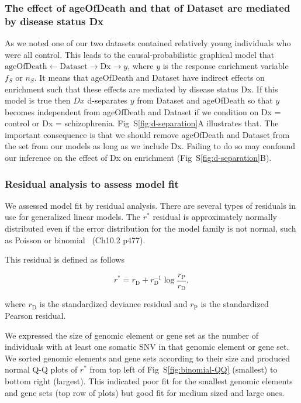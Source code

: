 \documentclass[letterpaper]{article}
\begin{document}
\subsubsection*{The effect of ageOfDeath and that of Dataset are mediated by disease status Dx}

As we noted one of our two datasets contained relatively young individuals who
were all control.  This leads to the causal-probabilistic graphical model that
\(\mathrm{ageOfDeath} \leftarrow \mathrm{Dataset} \rightarrow \mathrm{Dx}
\rightarrow y\), where \(y\) is the response enrichment variable \(f_S\) or
\(n_S\).  It means that ageOfDeath and Dataset have indirect effects on
enrichment such that these effects are mediated by disease status Dx. If this
model is true then \(Dx\) d-separates \(y\) from Dataset and ageOfDeath so
that \(y\) becomes independent from ageOfDeath and Dataset if we condition on
Dx = control or Dx = schizophrenia.  Fig~S\ref{fig:d-separation}A illustrates
that.  The important consequence is that we should remove ageOfDeath and
Dataset from the set from our models as long as we include Dx.  Failing to do
so may confound our inference on the effect of Dx on enrichment
(Fig~S\ref{fig:d-separation}B).

\subsubsection*{Residual analysis to assess model fit }

We assessed model fit by residual analysis.  There are several types of residuals in use for generalized linear models.
The $r^\ast$ residual is approximately normally distributed even if the error
distribution for the model family is not normal, such as Poisson or
binomial~\citep{davison2003statistical} (Ch10.2 p477).

This residual is defined as follows

$$
r^\ast = r_\mathrm{D} + r_\mathrm{D}^{-1} \log
\frac{r_\mathrm{P}}{r_\mathrm{D}},
$$

where \(r_\mathrm{D}\) is the standardized deviance residual and
\(r_\mathrm{P}\) is the standardized Pearson residual.

We expressed the size of genomic element or gene set as the number of
individuals with at least one somatic SNV in that genomic element or gene set.
We sorted genomic elements and gene sets according to their size and produced
normal Q-Q plots of \(r^\ast\) from top left of Fig~S\ref{fig:binomial-QQ} (smallest) to
bottom right (largest).  This indicated poor fit for the smallest genomic
elements and gene sets (top row of plots) but good fit for medium sized and
large ones.
\end{document}
